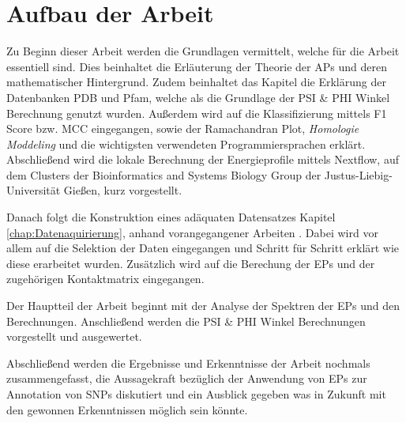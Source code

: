 \section{Aufbau der Arbeit}

Zu Beginn dieser Arbeit werden die Grundlagen vermittelt, welche für die Arbeit essentiell sind. Dies beinhaltet die Erläuterung der Theorie der \ac{APs} und deren mathematischer Hintergrund. Zudem beinhaltet das Kapitel die Erklärung der Datenbanken \ac{PDB} und \ac{Pfam}, welche als die Grundlage der PSI \& PHI Winkel Berechnung genutzt wurden. 
Außerdem wird auf die Klassifizierung mittels F1 Score bzw. \ac{MCC} eingegangen, sowie der Ramachandran Plot, \emph{Homologie Moddeling} und die wichtigsten verwendeten Programmiersprachen
erklärt. Abschließend wird die lokale Berechnung der Energieprofile mittels Nextflow, auf dem Clusters der Bioinformatics and Systems Biology Group der Justus-Liebig-Universität Gießen, kurz vorgestellt.


Danach folgt die Konstruktion eines adäquaten Datensatzes Kapitel \ref{chap:Datenaquirierung}, anhand vorangegangener Arbeiten \cite{Mathias.2014}. Dabei wird vor allem auf die Selektion der Daten eingegangen und Schritt für Schritt erklärt wie diese erarbeitet wurden. Zusätzlich wird auf die Berechung der \ac{EP}s und der zugehörigen Kontaktmatrix eingegangen.

Der Hauptteil der Arbeit beginnt mit der Analyse der Spektren der \ac{EP}s und den Berechnungen. Anschließend werden die PSI \& PHI Winkel Berechnungen vorgestellt und ausgewertet.

Abschließend werden die Ergebnisse und Erkenntnisse der Arbeit nochmals zusammengefasst, die Aussagekraft bezüglich der Anwendung von \ac{EP}s zur Annotation von \ac{SNP}s diskutiert und ein Ausblick gegeben was in Zukunft mit den gewonnen Erkenntnissen möglich sein könnte.

